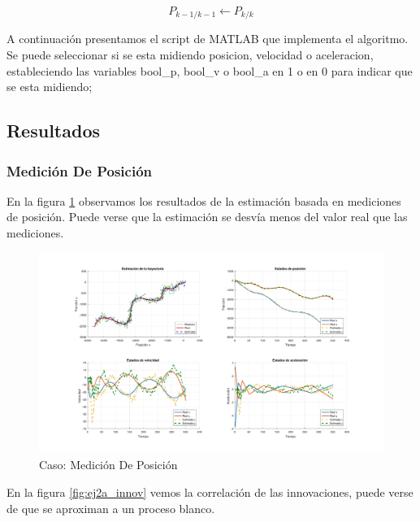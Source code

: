 				\begin{equation*}
					P_{k - 1/k - 1} \leftarrow P_{k/k}
				\end{equation*}
	
	A continuación presentamos el script de MATLAB que implementa el algoritmo. Se puede seleccionar si se esta midiendo posicion, velocidad o aceleracion, estableciendo las variables bool\_p, bool\_v o bool\_a en 1 o en 0 para indicar que se esta midiendo;
	

	\subsection{Resultados}
		\subsubsection{Medición De Posición}
			En la figura \ref{fig:ej2a} observamos los resultados de la estimación basada en mediciones de posición. Puede verse que la estimación se desvía menos del valor real que las mediciones.

		\begin{figure}[H]
			\centering
			\includegraphics[width=1.0\textwidth,keepaspectratio]{Figuras/graf_ej2a.pdf}
			\caption{Caso: Medición De Posición}
			\label{fig:ej2a}
		\end{figure}
		
		En la figura \ref{fig:ej2a_innov} vemos la correlación de las innovaciones, puede verse de que se aproximan a un proceso blanco.
		
